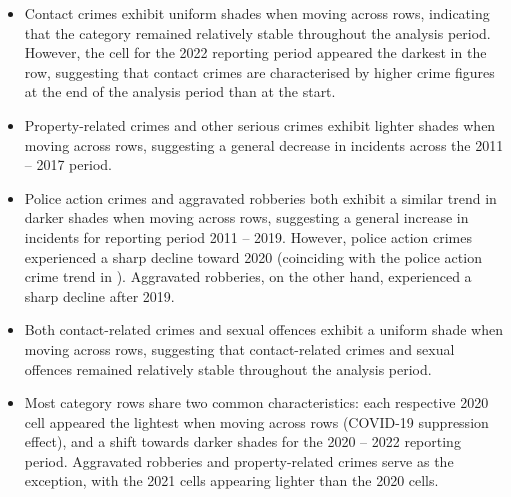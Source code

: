 \documentclass[titlepage, 12pt, oneside]{article}
\numberwithin{equation}{section}
\begin{document}
	\begin{itemize}
    \item Contact crimes exhibit uniform shades when moving across rows, indicating that the category remained relatively stable throughout the analysis period. However, the cell for the 2022 reporting period appeared the darkest in the row, suggesting that contact crimes are characterised by higher crime figures at the end of the analysis period than at the start. 
	\item Property-related crimes and other serious crimes exhibit lighter shades when moving across rows, suggesting a general decrease in incidents across the 2011 -- 2017 period.
	\item Police action crimes and aggravated robberies both exhibit a similar trend in darker shades when moving across rows, suggesting a general increase in incidents for reporting period 2011 -- 2019. However, police action crimes experienced a sharp decline toward 2020 (coinciding with the police action crime trend in ). Aggravated robberies, on the other hand, experienced a sharp decline after 2019. 
	\item Both contact-related crimes and sexual offences exhibit a uniform shade when moving across rows, suggesting that contact-related crimes and sexual offences remained relatively stable throughout the analysis period.
	\item Most category rows share two common characteristics: each respective 2020 cell appeared the lightest when moving across rows (COVID-19 suppression effect), and a shift towards darker shades for the 2020 -- 2022 reporting period. Aggravated robberies and property-related crimes serve as the exception, with the 2021 cells appearing lighter than the 2020 cells. 
	\end{itemize}
	
\end{document}
